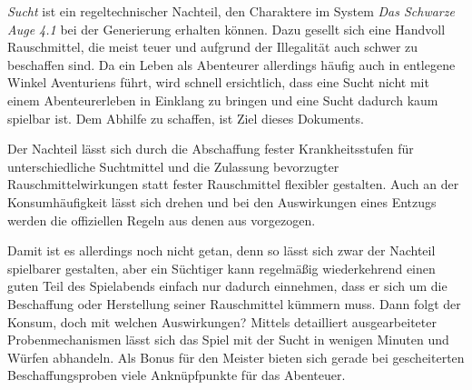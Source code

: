 \emph{Sucht} ist ein regeltechnischer Nachteil, den Charaktere im System \emph{Das Schwarze Auge 4.1} bei der Generierung erhalten können. Dazu gesellt sich eine Handvoll Rauschmittel, die meist teuer und aufgrund der Illegalität auch schwer zu beschaffen sind. Da ein Leben als Abenteurer allerdings häufig auch in entlegene Winkel Aventuriens führt, wird schnell ersichtlich, dass eine Sucht nicht mit einem Abenteurerleben in Einklang zu bringen und eine Sucht dadurch kaum spielbar ist. Dem Abhilfe zu schaffen, ist Ziel dieses Dokuments.

Der Nachteil lässt sich durch die Abschaffung fester Krankheitsstufen für unterschiedliche Suchtmittel und die Zulassung bevorzugter Rauschmittelwirkungen statt fester Rauschmittel flexibler gestalten. Auch an der Konsumhäufigkeit lässt sich drehen und bei den Auswirkungen eines Entzugs werden die offiziellen Regeln aus  denen aus  vorgezogen.

Damit ist es allerdings noch nicht getan, denn so lässt sich zwar der Nachteil spielbarer gestalten, aber ein Süchtiger kann regelmäßig wiederkehrend einen guten Teil des Spielabends einfach nur dadurch einnehmen, dass er sich um die Beschaffung oder Herstellung seiner Rauschmittel kümmern muss. Dann folgt der Konsum, doch mit welchen Auswirkungen? Mittels detailliert ausgearbeiteter Probenmechanismen lässt sich das Spiel mit der Sucht in wenigen Minuten und Würfen abhandeln. Als Bonus für den Meister bieten sich gerade bei gescheiterten Beschaffungsproben viele Anknüpfpunkte für das Abenteuer.
